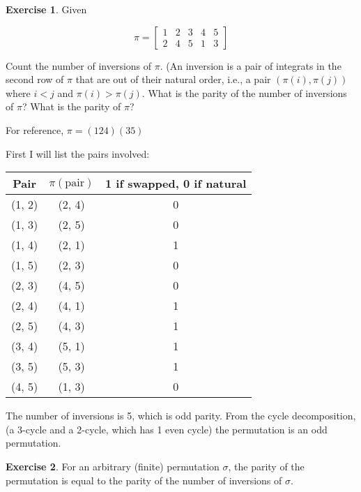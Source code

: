 \documentclass[11pt,oneside]{article}
\numberwithin{equation}{section}
\theoremstyle{definition}
\newtheorem{exercise}{Exercise}
\begin{document}
\begin{exercise}
  Given
  \begin{center}
  $$
  \pi = \begin{bmatrix}
    1 & 2 & 3 & 4 & 5 \\
    2 & 4 & 5 & 1 & 3
  \end{bmatrix}
  $$
  \end{center}
Count the number of inversions of $\pi$. (An inversion is a pair of
integrats in the second row of $\pi$ that are out of their natural
order, i.e., a pair $(\pi(i), \pi(j))$ where $i < j$ and $\pi(i) > \pi(j)$.
What is the parity of the number of inversions of $\pi$? What is the parity of $\pi$?
\end{exercise}
\begin{solution}
  For reference, $\pi = (1 2 4) (3 5)$

  First I will list the pairs involved:
  
  \begin{tabular}{| c | c | c |}
      \hline 
    Pair & $\pi(\text{pair})$ & 1 if swapped, 0 if natural \\
      \hline 
    (1, 2) & (2, 4) & 0 \\
    (1, 3) & (2, 5) & 0 \\
    (1, 4) & (2, 1) & 1 \\
    (1, 5) & (2, 3) & 0 \\
    (2, 3) & (4, 5) & 0 \\
    (2, 4) & (4, 1) & 1 \\
    (2, 5) & (4, 3) & 1 \\
    (3, 4) & (5, 1) & 1 \\
    (3, 5) & (5, 3) & 1 \\
    (4, 5) & (1, 3) & 0 \\
\hline
  \end{tabular}

  The number of inversions is 5, which is odd parity.  From the cycle
  decomposition, (a 3-cycle and a 2-cycle, which has 1 even cycle) the
  permutation is an odd permutation.
  
\end{solution}
\begin{exercise}
For an arbitrary (finite) permutation $\sigma$, the parity of the
permutation is equal to the parity of the number of inversions of
$\sigma$.  
\end{exercise}
\end{document}
